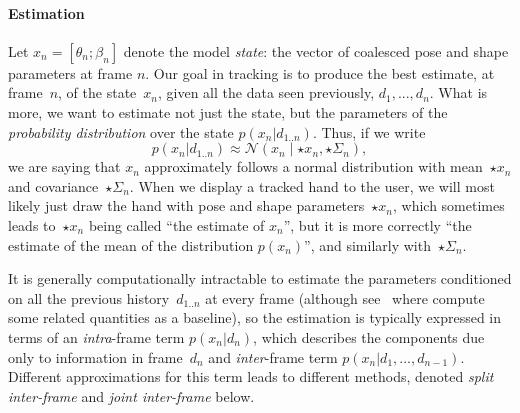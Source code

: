 \paragraph{Estimation}
Let $x_n = [\theta_n; \beta_n]$ denote the model {\em state}: the vector of coalesced pose and shape parameters at frame $n$.  
Our goal in tracking is to produce the best estimate, at frame~$n$, of the state~$x_n$, given all the data seen previously, $d_1, ..., d_n$.
What is more, we want to estimate not just the state, but the parameters of the {\em probability distribution} over the state $p(x_n|d_{1..n})$.  Thus, if we write
\begin{equation}
p(x_n|d_{1..n}) \approx \mathcal N(x_n \mid \star x_n, \star\Sigma_n),
\end{equation}
we are saying that $x_n$ approximately follows a normal distribution with mean~$\star x_n$ and covariance~$\star\Sigma_n$.  When we display a tracked hand to the user, we will most likely just draw the hand with pose and shape parameters~$\star x_n$, which sometimes leads to~$\star x_n$ being called ``the estimate of $x_n$'', but it is more correctly ``the estimate of the mean of the distribution $p(x_n)$'', and similarly with~$\star\Sigma_n$.

It is generally computationally intractable to estimate the parameters conditioned on all the previous history~$d_{1..n}$ at every frame (although see~ where compute some related quantities as a baseline), so the estimation is typically expressed in terms of an {\em intra}-frame term $p(x_n|d_n)$, which describes the components due only to information in frame~$d_n$ and {\em inter}-frame term $p(x_n|d_1, ..., d_{n-1})$.  Different approximations for this term leads to different methods, denoted {\em split inter-frame} and {\em joint inter-frame} below.




